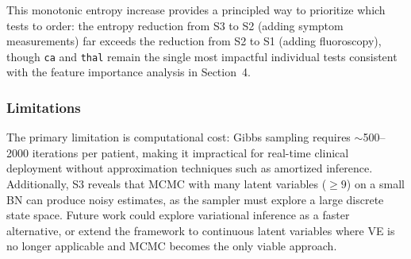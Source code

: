 This monotonic entropy increase provides a principled way to prioritize which tests to order: the entropy reduction from S3 to S2 (adding symptom measurements) far exceeds the reduction from S2 to S1 (adding fluoroscopy), though \texttt{ca} and \texttt{thal} remain the single most impactful individual tests consistent with the feature importance analysis in Section~4.

\subsubsection{Limitations}

The primary limitation is computational cost: Gibbs sampling requires $\sim$500--2000 iterations per patient, making it impractical for real-time clinical deployment without approximation techniques such as amortized inference. Additionally, S3 reveals that MCMC with many latent variables ($\geq 9$) on a small BN can produce noisy estimates, as the sampler must explore a large discrete state space. Future work could explore variational inference as a faster alternative, or extend the framework to continuous latent variables where VE is no longer applicable and MCMC becomes the only viable approach.
